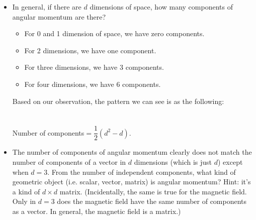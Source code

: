 \documentclass[fleqn]{article}
\begin{document}
\begin{enumerate}
\begin{itemize}
      \item In general, if there are $d$ dimensions of space, how many components of angular momentum are there?

        \textcolor{hwColor}{
          \begin{itemize}
            \item For 0 and 1 dimension of space, we have zero components.
            \item For 2 dimensions, we have one component.
            \item For three dimensions, we have 3 components.
            \item For four dimensions, we have 6 components.
          \end{itemize}
        }

        \textcolor{hwColor}{
          Based on our observation, the pattern we can see is as the following:
          \\
          \\
          \\
          Number of components$=\dfrac{1}{2}\left(d^2-d\right)$.
        }

      \item The number of components of angular momentum clearly does not match the number of components of a vector in $d$ dimensions
      (which is just $d$) except when $d=3$. From the number of independent components, what kind of geometric object (i.e. scalar,
      vector, matrix) is angular momentum?
      Hint: it’s a kind of $d \times d$ matrix. (Incidentally, the same is true for the magnetic field. Only 
      in $d=3$ does the magnetic field have the same number of components as a vector. In general, the magnetic field is a matrix.)
    

\end{itemize}
\end{enumerate}
\end{document}
